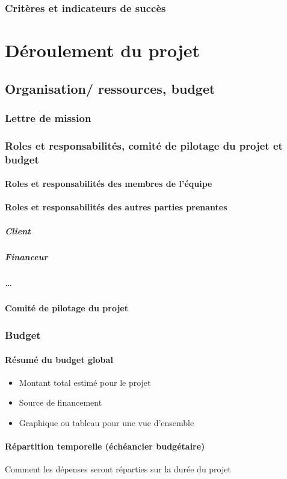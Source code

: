 \subsubsection{Critères et indicateurs de succès}


\section{Déroulement du projet}
\subsection{Organisation/ ressources, budget}
\subsubsection{Lettre de mission}
\subsubsection{Roles et responsabilités, comité de pilotage du projet et budget}
\paragraph{Roles et responsabilités des membres de l'équipe}
\paragraph{Roles et responsabilités des autres parties prenantes}
    \subparagraph{Client}
    \subparagraph{Financeur}
    \subparagraph{\dots}
\paragraph{Comité de pilotage du projet}

\subsubsection{Budget}
\paragraph{Résumé du budget global}
\begin{itemize}
    \item Montant total estimé pour le projet
    \item Source de financement 
    \item Graphique ou tableau pour une vue d'ensemble
\end{itemize}
\paragraph{Répartition temporelle (échéancier budgétaire)}
Comment les dépenses seront réparties sur la durée du projet

